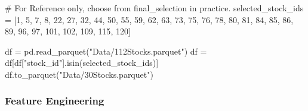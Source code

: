 \documentclass[
  letterpaper,
  DIV=11,
  numbers=noendperiod]{scrartcl}
\newenvironment{Shaded}{\begin{snugshade}}{\end{snugshade}}
\newcommand{\CommentTok}[1]{\textcolor[rgb]{0.37,0.37,0.37}{#1}}
\newcommand{\DecValTok}[1]{\textcolor[rgb]{0.68,0.00,0.00}{#1}}
\newcommand{\NormalTok}[1]{\textcolor[rgb]{0.00,0.23,0.31}{#1}}
\newcommand{\OperatorTok}[1]{\textcolor[rgb]{0.37,0.37,0.37}{#1}}
\newcommand{\StringTok}[1]{\textcolor[rgb]{0.13,0.47,0.30}{#1}}
\begin{document}
\begin{Shaded}
\begin{Highlighting}[]
\CommentTok{\# For Reference only, choose from final\_selection in practice. }
\NormalTok{selected\_stock\_ids }\OperatorTok{=}\NormalTok{ [}\DecValTok{1}\NormalTok{, }\DecValTok{5}\NormalTok{, }\DecValTok{7}\NormalTok{, }\DecValTok{8}\NormalTok{, }\DecValTok{22}\NormalTok{, }\DecValTok{27}\NormalTok{, }\DecValTok{32}\NormalTok{, }\DecValTok{44}\NormalTok{, }\DecValTok{50}\NormalTok{, }\DecValTok{55}\NormalTok{, }
                      \DecValTok{59}\NormalTok{, }\DecValTok{62}\NormalTok{, }\DecValTok{63}\NormalTok{, }\DecValTok{73}\NormalTok{, }\DecValTok{75}\NormalTok{, }\DecValTok{76}\NormalTok{, }\DecValTok{78}\NormalTok{, }\DecValTok{80}\NormalTok{, }\DecValTok{81}\NormalTok{, }\DecValTok{84}\NormalTok{, }
                      \DecValTok{85}\NormalTok{, }\DecValTok{86}\NormalTok{, }\DecValTok{89}\NormalTok{, }\DecValTok{96}\NormalTok{, }\DecValTok{97}\NormalTok{, }\DecValTok{101}\NormalTok{, }\DecValTok{102}\NormalTok{, }\DecValTok{109}\NormalTok{, }\DecValTok{115}\NormalTok{, }\DecValTok{120}\NormalTok{]}

\NormalTok{df }\OperatorTok{=}\NormalTok{ pd.read\_parquet(}\StringTok{"Data/112Stocks.parquet"}\NormalTok{)}
\NormalTok{df }\OperatorTok{=}\NormalTok{ df[df[}\StringTok{"stock\_id"}\NormalTok{].isin(selected\_stock\_ids)]}
\NormalTok{df.to\_parquet(}\StringTok{"Data/30Stocks.parquet"}\NormalTok{)}
\end{Highlighting}
\end{Shaded}

\subsubsection{Feature Engineering}\label{feature-engineering-1}
\end{document}
